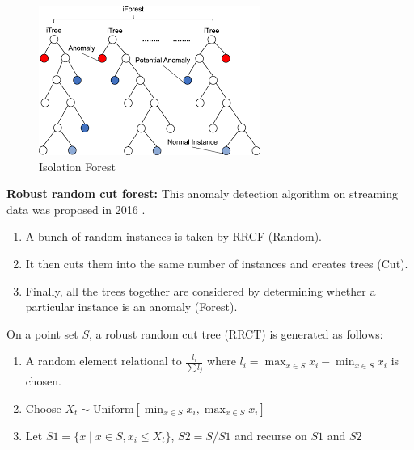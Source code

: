 \documentclass[12pt]{report}
\begin{document}
\begin{figure}[h]
    \centering
    \includegraphics[scale =0.5]{iso.png}
    \caption{Isolation Forest}
    \label{fig:if}
\end{figure}
\clearpage
\item \textbf{Robust
random cut forest:}
This anomaly detection algorithm on streaming data was
proposed in 2016 \cite{paper3}. 
\begin{enumerate}
    \item A bunch of random instances is taken by RRCF
(Random).
\item It then cuts them into the same number of instances
and creates trees (Cut).
\item Finally, all the trees together are considered by
determining whether a particular instance is an
anomaly (Forest).
\end{enumerate}
\par

On a point set $S$, a robust random cut tree (RRCT) is generated as follows:
\begin{enumerate}
    \item A random element relational to $\frac{l_i}{\sum l_j}$ where $l_i = \max_{x \in S} x_i - \min_{x \in S} x_i$ is chosen.
    \item Choose $X_t \sim \text{Uniform}[\min_{x \in S} x_i, \max_{x \in S} x_i]$
    \item Let $S1 = \{ x \mid x \in S, x_i \leq X_t \}$, $S2 = S / S1$ and recurse on $S1$ and $S2$
\end{enumerate}
\end{document}
